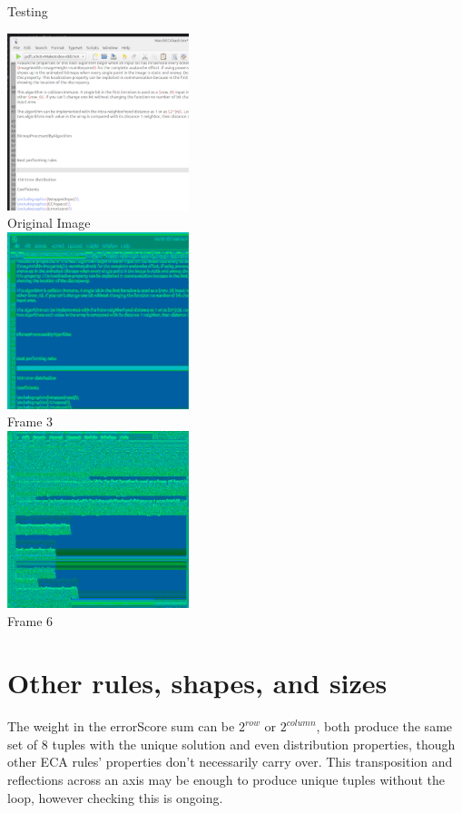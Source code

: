 \documentclass[11pt]{article}
\begin{document}
Testing\\


\begin{center}
\includegraphics{testScreenshot}\\
Original Image\\
\includegraphics{processedDepth3}\\
Frame 3\\
\includegraphics{processedDepth6}\\
Frame 6\\
\end{center}

\section{Other rules, shapes, and sizes}

The weight in the errorScore sum can be $2^{row}$ or $2^{column}$, both produce the same set of 8 tuples with the unique solution and even distribution properties, though other ECA rules' properties don't necessarily carry over. This transposition and reflections across an axis may be enough to produce unique tuples without the loop, however checking this is ongoing.\\
\end{document}
